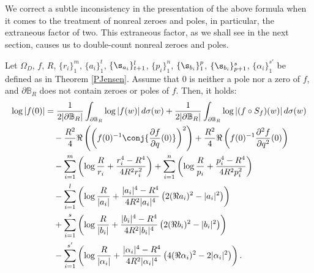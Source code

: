 \documentclass{amsart}
\begin{document}
We correct a subtle inconsistency in the presentation of the above formula when it comes to the treatment of nonreal zeroes and poles, in particular, the extraneous factor of two. This extraneous factor, as we shall see in the next section, causes us to double-count nonreal zeroes and poles.   

\begin{teo}\label{Jensen}
   Let $\Omega_D$, $f$, $R$, $\{r_i\}_1^m$,  $\{a_i\}_1^t$, $\{\s_{a_i}\}_{t+1}^l$, $\{p_i\}_1^n$, $\{\s_{b_i}\}_1^p$, $\{\s_{b_i}\}_{p+1}^s$, $\{\alpha_i\}_{1}^{s'}$ be defined as in Theorem \ref{PJensen}. Assume that $0$ is neither a pole nor a zero of $f$, and $\partial \mathbb B_R$ does not contain zeroes or poles of $f$. Then, it holds:  
   \begin{align*}\log|f(0)|&=\frac{1}{2|\partial \mathbb B_R|}\int_{\partial \mathbb B_R}\log|f(w)|\,d\sigma(w)+\frac{1}{2|\partial \mathbb B_R|}\int_{\partial \mathbb B_R}\log|(f\circ S_f)(w)|\,d\sigma(w)\\  
   &\quad-\frac{R^2}{4}\Re \left(\left(f(0)^{-1}\conj{\frac{\partial f}{\partial q}(0)}\right)^2\right)+\frac {R^2}4\Re\left(f(0)^{-1}\frac{\partial^2f}{\partial q^2}(0)\right) \\
  &\quad -\sum_{i=1}^m\left(\log\frac{R}{r_i}+\frac{r_i^4-R^4}{4R^2r_i^2}\right) + \sum_{i=1}^n\left(\log\frac{R}{p_i}+\frac{p_i^4-R^4}{4R^2p_i^2}\right) 
    \\ &\quad-\sum_{i=1}^l\left(\log\frac{R}{|a_i|}+\frac{|a_i|^4-R^4}{4R^2|a_i|^4}\left(2(\Re a_i)^2-|a_i|^2\right)\right) 
    \\&\quad+\sum_{i=1}^s\left(\log\frac{R}{|b_i|}+\frac{|b_i|^4-R^4}{4R^2|b_i|^4}\left(2(\Re b_i)^2-|b_i|^2\right)\right)
    \\&\quad -\sum_{i=1}^{s'}\left(\log\frac{R}{|\alpha_i|}+\frac{|\alpha_i|^4-R^4}{4R^2|\alpha_i|^4}\left(4(\Re \alpha_i)^2-2|\alpha_i|^2\right)\right).
   \end{align*}
\end{teo}
\end{document}
